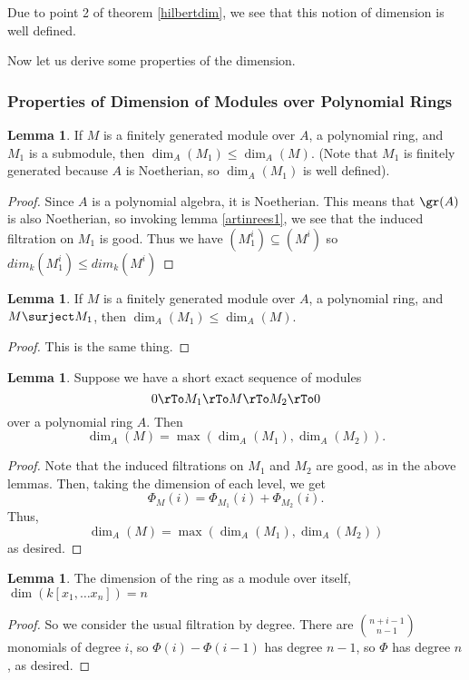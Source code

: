 \documentclass[12 pt]{article}
\theoremstyle{definition}
\newtheorem{lemma}[thm]{Lemma}
\renewcommand{\(}{\left(}
\renewcommand{\)}{\right)}
\begin{document}
Due to point 2 of theorem \ref{hilbertdim}, we see that this notion of dimension is well defined.

Now let us derive some properties of the dimension.




\subsubsection{Properties of Dimension of Modules over Polynomial Rings}

\begin{lemma} If $M$ is a finitely generated module over $A$, a polynomial ring, and $M_1$ is a submodule, then $\dim_A(M_1) \leq \dim_A(M)$. (Note that $M_1$ is finitely generated because $A$ is Noetherian, so $\dim_A(M_1)$ is well defined).
\end{lemma}
\begin{proof} Since $A$ is a polynomial algebra, it is Noetherian. This means that $\gr(A)$ is also Noetherian, so invoking lemma \ref{artinrees1}, we see that the induced filtration on $M_1$ is good. Thus we have $(M_1^i) \subseteq (M^i)$ so $dim_k(M_1^i) \leq dim_k(M^i)$
\end{proof}



\begin{lemma} If $M$ is a finitely generated module over $A$, a polynomial ring, and $M \surject M_1$, then $\dim_A(M_1) \leq \dim_A(M)$.
\end{lemma}
\begin{proof} This is the same thing.
\end{proof}


\begin{lemma} Suppose we have a short exact sequence of modules
\[0 \rTo M_1 \rTo M \rTo M_2 \rTo 0\]
over a polynomial ring $A$. Then
\[\dim_A(M)=\max(\dim_A(M_1), \dim_A(M_2)).\]
\label{ses hilb dim}
\end{lemma}
\begin{proof} Note that the induced filtrations on $M_1$ and $M_2$ are good, as in the above lemmas. Then, taking the dimension of each level, we get
\[\Phi_M(i)=\Phi_{M_1}(i)+\Phi_{M_2}(i).\]
Thus,
\[\dim_A(M)=\max(\dim_A(M_1), \dim_A(M_2))\]
as desired.
\end{proof}



\begin{lemma} The dimension of the ring as a module over itself, $\dim(k[x_1, \ldots x_n])=n$
\end{lemma}
\begin{proof} So we consider the usual filtration by degree. There are $\binom{n+i-1}{n-1}$ monomials of degree $i$, so $\Phi(i)-\Phi(i-1)$ has degree $n-1$, so $\Phi$ has degree $n$, as desired.
\end{proof}
\end{document}
